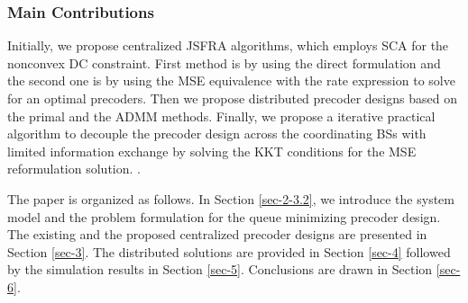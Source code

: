 \subsubsection*{Main Contributions}
 Initially, we propose centralized \ac{JSFRA} algorithms, which employs \ac{SCA} for the nonconvex \ac{DC} constraint. First method is by using the direct formulation and the second one is by using the \ac{MSE} equivalence with the rate expression to solve for an optimal precoders. Then we propose distributed precoder designs based on the primal and the \ac{ADMM} methods. Finally, we propose a iterative practical algorithm to decouple the precoder design across the coordinating \acp{BS} with limited information exchange by solving the \ac{KKT} conditions for the \ac{MSE} reformulation solution. .

The paper is organized as follows. In Section \ref{sec-2-3.2}, we introduce the system model and the problem formulation for the queue minimizing precoder design. The existing and the proposed centralized precoder designs are presented in Section \ref{sec-3}. The distributed solutions are provided in Section \ref{sec-4} followed by the simulation results in Section \ref{sec-5}. Conclusions are drawn in Section \ref{sec-6}.